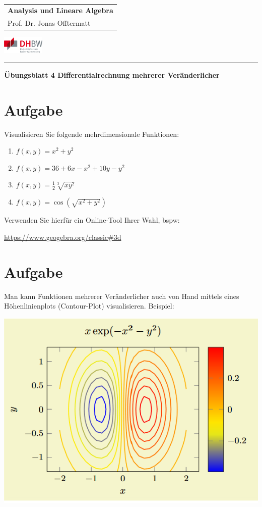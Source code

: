 \documentclass[fontsize=11pt, parskip=half]{scrartcl}
\begin{document}
\noindent
\begin{tabular}{l}
    \textbf{Analysis und Lineare Algebra} \\    
    Prof. Dr. Jonas Offtermatt
\end{tabular}
\hfill \includegraphics[width=2cm]{DHBW.pdf}\\
\rule{\textwidth}{0.5pt}


\begin{center}
    \Large
    \textbf{Übungsblatt 4 Differentialrechnung mehrerer Veränderlicher}
\end{center}
\section{Aufgabe}
Visualisieren Sie folgende mehrdimensionale Funktionen:
\begin{enumerate}[label=\alph*)]
    \item $f(x,y) = x^2 + y^2$
    \item $f(x,y) = 36 + 6x -x^2 + 10 y - y^2$
    \item $f(x,y) = \frac{1}{2}\sqrt[3]{x y^2}$
    \item $f(x,y) = \cos (\sqrt{x^2 + y^2})$
\end{enumerate}
Verwenden Sie hierfür ein Online-Tool Ihrer Wahl, bspw: 

\url{https://www.geogebra.org/classic#3d}

\section{Aufgabe}
Man kann Funktionen mehrerer Veränderlicher auch von Hand mittels eines Höhenlinienplots (Contour-Plot) visualisieren. 
Beispiel:

\includegraphics{countourplot.png}
\end{document}
